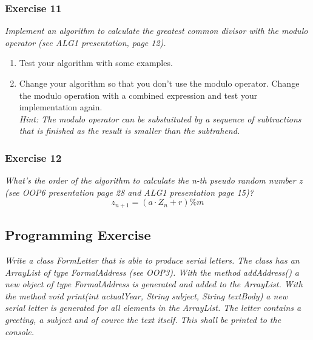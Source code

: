 \subsubsection*{Exercise 11}
\textit{Implement an algorithm to calculate the greatest common divisor
with the modulo operator (see ALG1 presentation, page 12).}\\



\begin{enumerate}[label={(\alph*)}]
	\item Test your algorithm with some examples.
	\item Change your algorithm so that you don't use the modulo operator. 
		Change the modulo operation with a combined expression and test 
		your implementation again. \\
		\textit{Hint: The modulo operator can be substuituted by a 
			sequence of subtractions that is finished as the 
			result is smaller than the subtrahend.}
		

\end{enumerate}

\subsubsection*{Exercise 12}
\textit{What's the order of the algorithm to calculate the n-th pseudo random 
number z (see OOP6 presentation page 28 and ALG1 presentation page 15)?}\\

\[ z_{n+1} = (a \cdot Z_n + r) \% m \]

\subsection{Programming Exercise}
\textit{Write a class FormLetter that is able to produce serial letters.
The class has an ArrayList of type FormalAddress (see OOP3). With the 
method addAddress() a new object of type FormalAddress is generated and
added to the ArrayList. With the method void print(int actualYear, String
subject, String textBody) a new serial letter is generated for all 
elements in the ArrayList. The letter contains a greeting, a subject and
of cource the text itself. This shall be printed to the console.}






